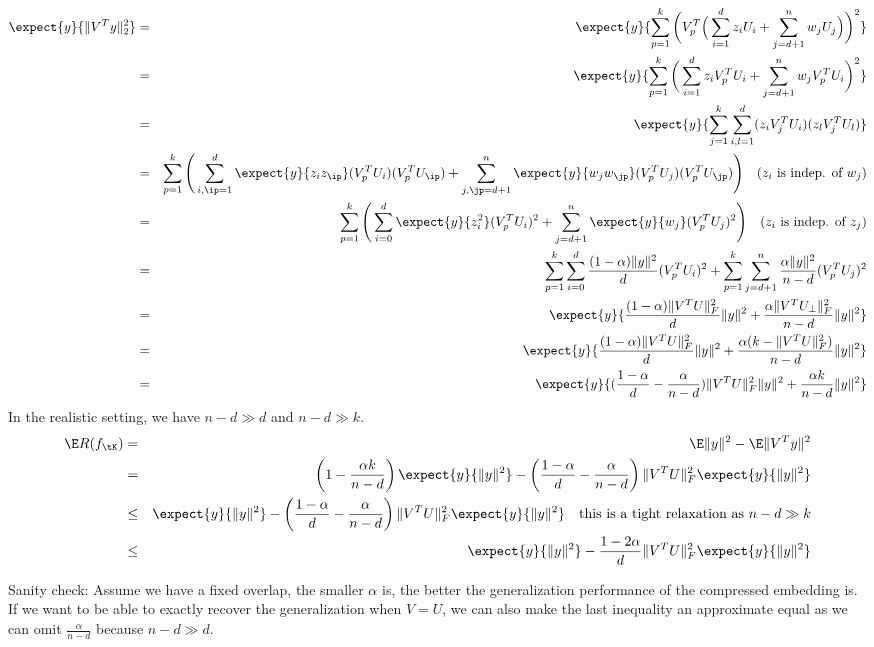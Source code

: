 \documentclass[12pt]{article}
\begin{document}
\begin{eqnarray*}
	\expect{y}{\|V^T y\|_2^2} &=& \expect{y}{\sum_{p=1}^k \bigg( V_p^T \Big(\sum_{i=1}^d z_i U_i + \sum_{j=d+1}^n w_j U_j\Big)\bigg)^2} \\
	&=& \expect{y}{\sum_{p=1}^k \bigg(\sum_{i=1}^d z_i V_p^TU_i + \sum_{j=d+1}^n w_j V_p^TU_i\bigg)^2} \\
	&=& \expect{y}{\sum_{j=1}^k \sum_{i,l=1}^d (z_i V_j^TU_i) (z_l V_j^TU_l) }\\
	&=& \sum_{p=1}^k \Bigg( \sum_{i,\ip=1}^d \expect{y}{z_i z_\ip} (V_p^TU_i) (V_p^TU_\ip) + \sum_{j, \jp=d+1}^n \expect{y}{w_j w_\jp} (V_p^TU_j) (V_p^TU_\jp) \Bigg) \quad \text{($z_i$ is indep. of $w_j$)}\\
	&=& \sum_{p=1}^k \Bigg( \sum_{i=0}^d \expect{y}{z_i^2} (V_p^TU_i)^2 + \sum_{j=d+1}^n \expect{y}{w_j} (V_p^TU_j)^2 \Bigg) \quad \text{($z_i$ is indep. of $z_j$)}\\
	&=& \sum_{p=1}^k \sum_{i=0}^d \frac{(1-\alpha) \|y\|^2}{d}(V_p^TU_i)^2 + \sum_{p=1}^k \sum_{j=d + 1}^n \frac{\alpha \|y\|^2}{n - d}(V_p^TU_j)^2 \\
	&=& \expect{y}{\frac{(1-\alpha)\|V^T U\|_F^2}{d} \| y \|^2 + \frac{\alpha \|V^TU_{\perp} \|^2_F}{n-d} \| y \|^2}\\
	&=& \expect{y}{\frac{(1-\alpha)\|V^T U\|_F^2}{d} \| y \|^2 + \frac{\alpha (k - \|V^TU \|^2_F)}{n-d} \| y \|^2}\\
	&=& \expect{y}{(\frac{1-\alpha}{d} - \frac{\alpha}{n - d}) \|V^T U\|_F^2 \|y \|^2 + \frac{\alpha k}{n - d} \| y \|^2}
\end{eqnarray*}
In the realistic setting, we have $n - d \gg d$ and $n -d \gg k$.
\begin{eqnarray*}
	\E R(f_{\tK}) &=& \E \| y \|^2 - \E \|V^T y \|^2 \\
		&=& \left(1 - \frac{\alpha k}{n - d}\right)\expect{y}{\| y \|^2} -  \left(\frac{1-\alpha}{d} - \frac{\alpha}{n - d}\right) \|V^T U\|_F^2 \expect{y}{\|y \|^2}\\
		&\leq & \expect{y}{\| y \|^2} - \left(\frac{1-\alpha}{d} - \frac{\alpha}{n - d}\right) \|V^T U\|_F^2 \expect{y}{\|y \|^2} \quad \text{this is a tight relaxation as $n -d \gg k$}\\
		&\leq & \expect{y}{\| y \|^2} - \frac{1-2\alpha}{d} \|V^T U\|_F^2 \expect{y}{\|y \|^2}
\end{eqnarray*}

Sanity check: Assume we have a fixed overlap, the smaller $\alpha$ is, the better the generalization performance of the compressed embedding is. If we want to be able to exactly recover the generalization when $V = U$, we can also make the last inequality an approximate equal as we can omit $\frac{\alpha}{n-d}$ because $n - d \gg d$.
\end{document}
